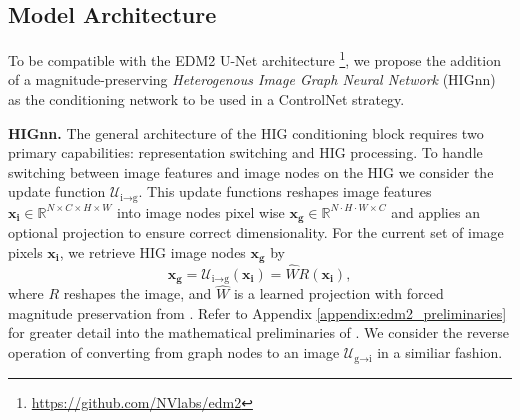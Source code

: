 
\subsection{Model Architecture}

To be compatible with the EDM2 U-Net architecture \footnote{\href{https://github.com/NVlabs/edm2}{https://github.com/NVlabs/edm2}}, we propose the addition of a magnitude-preserving \textit{Heterogenous Image Graph Neural Network} (HIGnn) as the conditioning network to be used in a ControlNet strategy.

\textbf{HIGnn.} The general architecture of the HIG conditioning block requires two primary capabilities: representation switching and HIG processing. To handle switching between image features and image nodes on the HIG we consider the update function $\mathcal{U}_{\text{i}\rightarrow\text{g}}$. This update functions reshapes image features $\mathbf{x_i} \in \mathbb{R}^{N \times C \times H \times W}$ into image nodes pixel wise $\mathbf{x_g} \in \mathbb{R}^{N\cdot H \cdot W \times C}$ and applies an optional projection to ensure correct dimensionality. For the current set of image pixels $\mathbf{x_i}$, we retrieve HIG image nodes $\mathbf{x_g}$ by
\begin{equation}
\mathbf{x_g} = \mathcal{U}_{\text{i}\rightarrow\text{g}}(\mathbf{x_i}) = \hat{W}R(\mathbf{x_i}),  
 \label{eq:HIG_update}
\end{equation}
where $R$ reshapes the image, and $\hat{W}$ is a learned projection with forced magnitude preservation from \cite{karras_analyzing_2024}. Refer to Appendix \ref{appendix:edm2_preliminaries} for greater detail into the mathematical preliminaries of \cite{karras_analyzing_2024}. We consider the reverse operation of converting from graph nodes to an image $\mathcal{U}_{\text{g}\rightarrow\text{i}}$ in a similiar fashion. 

